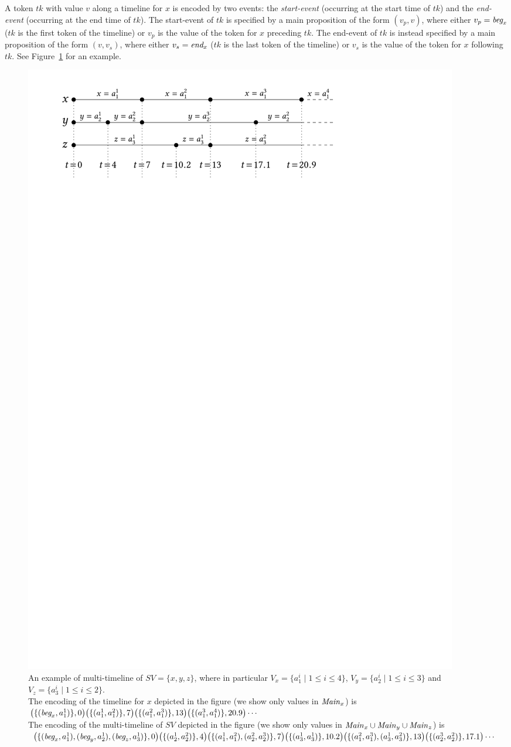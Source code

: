  A token $tk$ with value $v$ along a timeline for
 $x$ is encoded by two events: the \emph{start-event} (occurring at the start time of $tk$) and
 the \emph{end-event} (occurring at the end time of $tk$). The start-event of $tk$ is specified by a main proposition of the form
 $(v_p,v)$, where either $v_p=\textit{beg}_x$ ($tk$ is the first token of the timeline) or $v_p$ is the value of the token for $x$
preceding $tk$. The end-event of $tk$ is instead specified by a main proposition of the form
 $(v,v_s)$, where either $v_s=\textit{end}_x$ ($tk$ is the last token of the timeline) or $v_s$ is the value of the token for $x$
following $tk$. 
%
See Figure~\ref{fig:ktimelines} for an example.
%
\begin{figure}[tb]
    \centering
    \includegraphics[width=0.85\linewidth]{Chaps/Timelines/timelineFig.pdf}
    \caption{An example of multi-timeline of $SV=\{x,y,z\}$, where in particular $V_x=\{a_1^i\mid 1\leq i\leq 4\}$, $V_y=\{a_2^i\mid 1\leq i\leq 3\}$ and $V_z=\{a_3^i\mid 1\leq i\leq 2\}$. \\
    The encoding of the timeline for $x$ depicted in the figure (we show only values in ${\mathit{Main}}_x$) is $\big(\{(\textit{beg}_x,a_1^1)\},0\big)\big(\{(a_1^1,a_1^2)\},7\big)\big(\{(a_1^2,a_1^3)\},13\big)\big(\{(a_1^3,a_1^4)\},20.9\big)\cdots$ \\
    The encoding of the multi-timeline of $SV$ depicted in the figure (we show only values in ${\mathit{Main}}_x\cup{\mathit{Main}}_y\cup{\mathit{Main}}_z$) is $\big(\{(\textit{beg}_x,a_1^1),(\textit{beg}_y,a_2^1),(\textit{beg}_z,a_3^1)\},0\big)\allowbreak
    \big(\{(a_2^1,a_2^2)\},4\big)\allowbreak
    \big(\{(a_1^1,a_1^2),(a_2^2,a_2^3)\},7\big)
    \big(\{(a^1_3,a^1_3)\},10.2\big)
    \big(\{(a_1^2,a_1^3),(a^1_3,a^2_3)\},13\big)
    \big(\{(a^3_2,a^2_2)\},17.1\big)\cdots$}
    \label{fig:ktimelines}
\end{figure}

